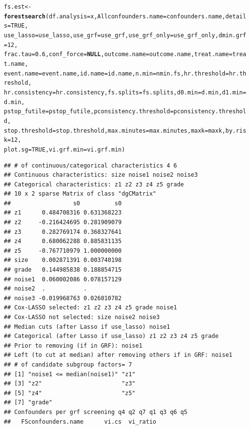 \documentclass[smallextended]{svjour3}
\makeatletter
\newcommand{\hlnum}[1]{\textcolor[rgb]{0.686,0.059,0.569}{#1}}%
\newcommand{\hlstd}[1]{\textcolor[rgb]{0.345,0.345,0.345}{#1}}%
\newcommand{\hlkwa}[1]{\textcolor[rgb]{0.161,0.373,0.58}{\textbf{#1}}}%
\newcommand{\hlkwb}[1]{\textcolor[rgb]{0.69,0.353,0.396}{#1}}%
\newcommand{\hlkwc}[1]{\textcolor[rgb]{0.333,0.667,0.333}{#1}}%
\newcommand{\hlkwd}[1]{\textcolor[rgb]{0.737,0.353,0.396}{\textbf{#1}}}%
\newenvironment{kframe}{%
 \def\at@end@of@kframe{}%
 \ifinner\ifhmode%
  \def\at@end@of@kframe{\end{minipage}}%
  \begin{minipage}{\columnwidth}%
 \fi\fi%
 \def\FrameCommand##1{\hskip\@totalleftmargin \hskip-\fboxsep
 \colorbox{shadecolor}{##1}\hskip-\fboxsep
     \hskip-\linewidth \hskip-\@totalleftmargin \hskip\columnwidth}%
 \MakeFramed {\advance\hsize-\width
   \@totalleftmargin\z@ \linewidth\hsize
   \@setminipage}}%
 {\par\unskip\endMakeFramed%
 \at@end@of@kframe}
\newenvironment{knitrout}{}{} %
\makeatother
\begin{document}
\begin{knitrout}
\begin{kframe}
\begin{alltt}
\hlstd{fs.est} \hlkwb{<-} \hlkwd{forestsearch}\hlstd{(}\hlkwc{df.analysis} \hlstd{= x,} \hlkwc{Allconfounders.name} \hlstd{= confounders.name,} \hlkwc{details} \hlstd{=} \hlnum{TRUE}\hlstd{,}
    \hlkwc{use_lasso} \hlstd{= use_lasso,} \hlkwc{use_grf} \hlstd{= use_grf,} \hlkwc{use_grf_only} \hlstd{= use_grf_only,} \hlkwc{dmin.grf} \hlstd{=} \hlnum{12}\hlstd{,}
    \hlkwc{frac.tau} \hlstd{=} \hlnum{0.6}\hlstd{,} \hlkwc{conf_force} \hlstd{=} \hlkwa{NULL}\hlstd{,} \hlkwc{outcome.name} \hlstd{= outcome.name,} \hlkwc{treat.name} \hlstd{= treat.name,}
    \hlkwc{event.name} \hlstd{= event.name,} \hlkwc{id.name} \hlstd{= id.name,} \hlkwc{n.min} \hlstd{= nmin.fs,} \hlkwc{hr.threshold} \hlstd{= hr.threshold,}
    \hlkwc{hr.consistency} \hlstd{= hr.consistency,} \hlkwc{fs.splits} \hlstd{= fs.splits,} \hlkwc{d0.min} \hlstd{= d.min,} \hlkwc{d1.min} \hlstd{= d.min,}
    \hlkwc{pstop_futile} \hlstd{= pstop_futile,} \hlkwc{pconsistency.threshold} \hlstd{= pconsistency.threshold,}
    \hlkwc{stop.threshold} \hlstd{= stop.threshold,} \hlkwc{max.minutes} \hlstd{= max.minutes,} \hlkwc{maxk} \hlstd{= maxk,} \hlkwc{by.risk} \hlstd{=} \hlnum{12}\hlstd{,}
    \hlkwc{plot.sg} \hlstd{=} \hlnum{TRUE}\hlstd{,} \hlkwc{vi.grf.min} \hlstd{= vi.grf.min)}
\end{alltt}
\begin{verbatim}
## # of continuous/categorical characteristics 4 6 
## Continuous characteristics: size noise1 noise2 noise3 
## Categorical characteristics: z1 z2 z3 z4 z5 grade 
## 10 x 2 sparse Matrix of class "dgCMatrix"
##                  s0          s0
## z1      0.484708316 0.631368223
## z2     -0.216424695 0.281909079
## z3      0.282769174 0.368327641
## z4      0.680062288 0.885831135
## z5     -0.767710979 1.000000000
## size    0.002871391 0.003740198
## grade   0.144985838 0.188854715
## noise1  0.060002086 0.078157129
## noise2  .           .          
## noise3 -0.019968763 0.026010782
## Cox-LASSO selected: z1 z2 z3 z4 z5 grade noise1 
## Cox-LASSO not selected: size noise2 noise3 
## Median cuts (after Lasso if use_lasso) noise1 
## Categorical (after Lasso if use_lasso) z1 z2 z3 z4 z5 grade 
## Prior to removing (if in GRF): noise1 
## Left (to cut at median) after removing others if in GRF: noise1 
## # of candidate subgroup factors= 7 
## [1] "noise1 <= median(noise1)" "z1"                      
## [3] "z2"                       "z3"                      
## [5] "z4"                       "z5"                      
## [7] "grade"                   
## Confounders per grf screening q4 q2 q7 q1 q3 q6 q5 
##   FSconfounders.name      vi.cs  vi_ratio

\end{verbatim}
\end{kframe}
\end{knitrout}
\end{document}
